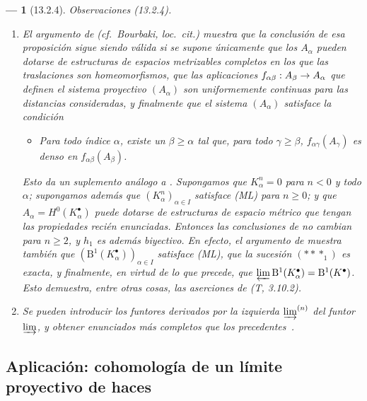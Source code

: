 \documentclass[10pt,oneside,openany]{book}
\theoremstyle{egaenv}\newtheorem*{env}{---}
\theoremstyle{egastatement}
\theoremstyle{egadescription}
\renewcommand{\geq}{\geqslant}
\renewcommand{\to}{\mathchoice{\longrightarrow}{\rightarrow}{\rightarrow}{\rightarrow}}
\begin{document}
\begin{env}[13.2.4]
\label{0.13.2.4}
\label{0.13.2.4-fr}
\emph{Observaciones} (13.2.4).
\begin{enumerate}
  \item[{\rm(i)}]
  El argumento de 
  (cf.\ Bourbaki, \emph{loc.\ cit.}) muestra que la conclusión de
  esa proposición sigue siendo válida si se supone únicamente que los
  $A_\alpha$ pueden dotarse de estructuras de espacios metrizables completos
  en los que las traslaciones son homeomorfismos, que las aplicaciones
  $f_{\alpha\beta}:A_\beta\to A_\alpha$ que definen el sistema proyectivo $(A_\alpha)$ son \emph{uniformemente continuas} para las distancias consideradas, y finalmente que el sistema $(A_\alpha)$ satisface la condición
  \begin{itemize}
    \item[(ML$'$)]
    \emph{Para todo índice $\alpha$, existe un $\beta\geq\alpha$ tal
    que, para todo $\gamma\geq\beta$,
    $f_{\alpha\gamma}(A_\gamma)$ es denso en
    $f_{\alpha\beta}(A_\beta)$.}
  \end{itemize}

  Esto da un suplemento análogo a .
  Supongamos que $K_\alpha^n=0$ para $n<0$ y todo $\alpha$; supongamos además que $(K_\alpha^n)_{\alpha\in I}$ satisface (ML) para
  $n\geq0$; y que
  $A_\alpha=H^0(K_\alpha^\bullet)$ puede dotarse de
  estructuras de espacio métrico que tengan las propiedades recién enunciadas.
  Entonces las conclusiones de  no cambian para
  $n\geq2$, y $h_1$ es además \emph{biyectivo}.
  En efecto, el argumento de  muestra también que
  $(\mathrm B^1(K_\alpha^\bullet))_{\alpha\in I}$
  satisface (ML), que la sucesión $(***_1)$ es exacta, y finalmente, en virtud de lo que precede, que $\varprojlim\mathrm B^1(K_\alpha^\bullet)=\mathrm B^1(K^\bullet)$.
  Esto demuestra, entre otras cosas, las aserciones de (T, 3.10.2).

  \item[{\rm(ii)}]
  Se pueden introducir los funtores derivados por la izquierda
  $\varinjlim^{(n)}$ del funtor $\varinjlim$, y obtener enunciados más
  completos que los precedentes~\cite{III-28}.
\end{enumerate}
\end{env}

\subsection{Aplicación: cohomología de un límite proyectivo de haces}
\label{subsection:0.13.3}
\label{subsection:0.13.3-fr}
\end{document}
